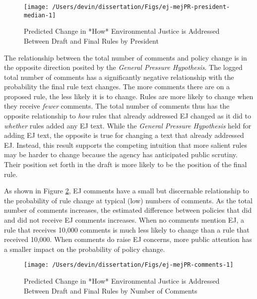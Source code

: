 \documentclass[
      12pt,
        ]{article}
\begin{document}
\begin{figure}

{\centering \texttt{[image: /Users/devin/dissertation/Figs/ej-mejPR-president-median-1]} 

}

\caption{Predicted Change in *How* Environmental Justice is Addressed Between Draft and Final Rules by President}\label{fig:ej-mejPR-president-median-1}
\end{figure}

The relationship between the total number of comments and policy change is in the opposite direction posited by the \emph{General Pressure Hypothesis}. The logged total number of comments has a significantly negative relationship with the probability the final rule text changes. The more comments there are on a proposed rule, the less likely it is to change. Rules are more likely to change when they receive \emph{fewer} comments. The total number of comments thus has the opposite relationship to \emph{how} rules that already addressed EJ changed as it did to \emph{whether} rules added any EJ text. While the \emph{General Pressure Hypothesis} held for adding EJ text, the opposite is true for changing a text that already addressed EJ. Instead, this result supports the competing intuition that more salient rules may be harder to change because the agency has anticipated public scrutiny. Their position set forth in the draft is more likely to be the position of the final rule.

As shown in Figure \ref{fig:ej-mejPR-comments}, EJ comments have a small but discernable relationship to the probability of rule change at typical (low) numbers of comments. As the total number of comments increases, the estimated difference between policies that did and did not receive EJ comments increases. When no comments mention EJ, a rule that receives 10,000 comments is much less likely to change than a rule that received 10,000. When comments do raise EJ concerns, more public attention has a smaller impact on the probability of policy change.

\begin{figure}

{\centering \texttt{[image: /Users/devin/dissertation/Figs/ej-mejPR-comments-1]} 

}

\caption{Predicted Change in *How* Environmental Justice is Addressed Between Draft and Final Rules by Number of Comments}\label{fig:ej-mejPR-comments}
\end{figure}
\end{document}
